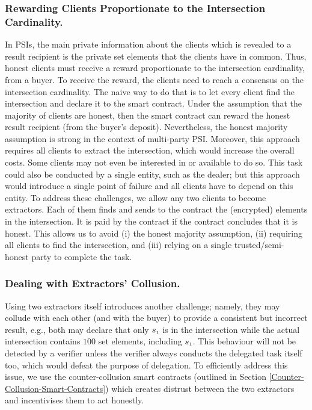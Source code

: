 \subsubsection{Rewarding Clients Proportionate to the Intersection Cardinality.}
In PSIs, the main private information about the clients which is revealed to a result recipient is the private set elements that the clients have in common. Thus, honest clients must receive a reward proportionate to the intersection cardinality, from a buyer. To receive the reward, the clients need to reach a consensus on the intersection cardinality. The naive way to do that is to let every client find the intersection and declare it to the smart contract. Under the assumption that the majority of clients are honest, then the smart contract can reward the honest result recipient (from the buyer's deposit). Nevertheless, the honest majority assumption is strong in the context of multi-party PSI. Moreover, this approach requires all clients to extract the intersection, which would increase the overall costs.  Some clients may not even be interested in or available to do so. This task could also be conducted by a single entity, such as the dealer; but this approach would introduce a single point of failure and all clients have to depend on this entity.  
%
To address these challenges, we allow any two clients to become extractors.  Each of them finds and sends to the contract the (encrypted) elements in the intersection. It is paid by the contract if the contract concludes that it is honest. This allows us to avoid (i) the honest majority assumption, (ii) requiring all clients to find the intersection, and (iii) relying on a single trusted/semi-honest party to complete the task. 



\subsubsection{Dealing with Extractors' Collusion.}
%
Using two extractors itself introduces another challenge; namely, they may collude with each other (and with the buyer) to provide a consistent but incorrect result, e.g., both may declare that only $s_{\scriptscriptstyle 1}$ is in the intersection while 
 the actual intersection contains $100$ set elements, including $s_{\scriptscriptstyle 1}$.  This behaviour will not be detected by a verifier unless the verifier always conducts the delegated task itself too, which would defeat the purpose of delegation. To efficiently address this issue, we use the counter-collusion smart contracts (outlined in Section \ref{Counter-Collusion-Smart-Contracts}) which creates distrust between the two extractors and incentivises them to act honestly. 

